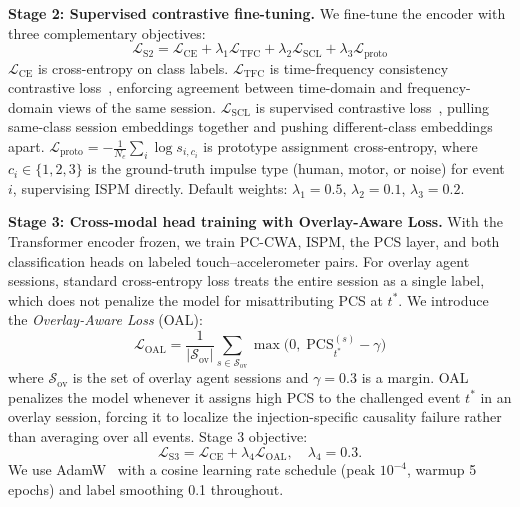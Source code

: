 \noindent\textbf{Stage 2: Supervised contrastive fine-tuning.}
We fine-tune the encoder with three complementary objectives:
\begin{equation}
\mathcal{L}_{\mathrm{S2}} = \mathcal{L}_{\mathrm{CE}}
  + \lambda_1 \mathcal{L}_{\mathrm{TFC}}
  + \lambda_2 \mathcal{L}_{\mathrm{SCL}}
  + \lambda_3 \mathcal{L}_{\mathrm{proto}}
\label{eq:stage2}
\end{equation}
$\mathcal{L}_{\mathrm{CE}}$ is cross-entropy on class labels.%
$\mathcal{L}_{\mathrm{TFC}}$ is time-frequency consistency contrastive loss~\cite{tfc2022},
enforcing agreement between time-domain and frequency-domain views of the same session.%
$\mathcal{L}_{\mathrm{SCL}}$ is supervised contrastive loss~\cite{supcon2020}, pulling
same-class session embeddings together and pushing different-class embeddings apart.%
$\mathcal{L}_{\mathrm{proto}} = -\frac{1}{N_e}\sum_i \log s_{i,c_i}$ is prototype
assignment cross-entropy, where $c_i \in \{1,2,3\}$ is the ground-truth impulse type
(human, motor, or noise) for event $i$, supervising ISPM directly.%
Default weights: $\lambda_1 = 0.5$, $\lambda_2 = 0.1$, $\lambda_3 = 0.2$.%

\noindent\textbf{Stage 3: Cross-modal head training with Overlay-Aware Loss.}
With the Transformer encoder frozen, we train PC-CWA, ISPM, the PCS layer, and both
classification heads on labeled touch--accelerometer pairs.%
For overlay agent sessions, standard cross-entropy loss treats the entire session as
a single label, which does not penalize the model for misattributing PCS at $t^*$.%
We introduce the \textit{Overlay-Aware Loss} (OAL):
\begin{equation}
\mathcal{L}_{\mathrm{OAL}} = \frac{1}{|\mathcal{S}_{\mathrm{ov}}|}
  \sum_{s \in \mathcal{S}_{\mathrm{ov}}}
  \max\!\bigl(0,\; \mathrm{PCS}_{t^*}^{(s)} - \gamma\bigr)
\label{eq:oal}
\end{equation}
where $\mathcal{S}_{\mathrm{ov}}$ is the set of overlay agent sessions and
$\gamma = 0.3$ is a margin.%
OAL penalizes the model whenever it assigns high PCS to the challenged event $t^*$ in
an overlay session, forcing it to localize the injection-specific causality failure
rather than averaging over all events.%
Stage 3 objective:
\begin{equation}
\mathcal{L}_{\mathrm{S3}} = \mathcal{L}_{\mathrm{CE}} + \lambda_4 \mathcal{L}_{\mathrm{OAL}},
\quad \lambda_4 = 0.3.
\label{eq:stage3}
\end{equation}
We use AdamW~\cite{adamw2019} with a cosine learning rate schedule (peak $10^{-4}$,
warmup 5 epochs) and label smoothing 0.1 throughout.%

